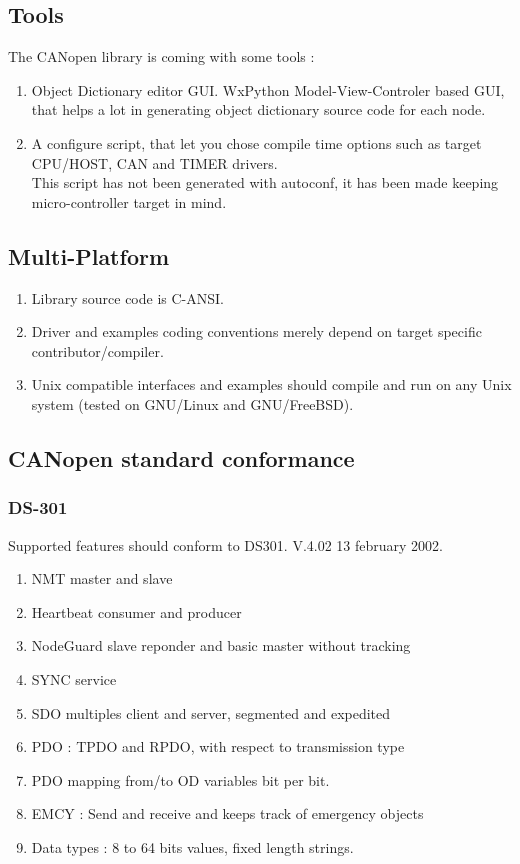 \documentclass[12pt,english,a4paper]{book}
\newcommand{\canopen}{CANopen }
\begin{document}
\subsection{Tools }

The \canopen library is coming with some tools :

\begin{enumerate}
\item Object Dictionary editor GUI. WxPython Model-View-Controler based
GUI, that helps a lot in generating object dictionary source code for
each node. 
\item A configure script, that let you chose compile time options such as
target CPU/HOST, CAN and TIMER drivers.\\
 This script has not been generated with autoconf, it has been made
keeping micro-controller target in mind. 
\end{enumerate}

\subsection{Multi-Platform}

\begin{enumerate}
\item Library source code is C-ANSI. 
\item Driver and examples coding conventions merely depend on target specific
contributor/compiler. 
\item Unix compatible interfaces and examples should compile and run on
any Unix system (tested on GNU/Linux and GNU/FreeBSD). 
\end{enumerate}

\subsection{\canopen standard conformance}

\subsubsection{DS-301}

Supported features should conform to DS301. V.4.02 13 february 2002. 

\begin{enumerate}
\item NMT master and slave
\item Heartbeat consumer and producer
\item NodeGuard slave reponder and basic master without tracking
\item SYNC service
\item SDO multiples client and server, segmented and expedited
\item PDO : TPDO and RPDO, with respect to transmission type
\item PDO mapping from/to OD variables bit per bit. 
\item EMCY : Send and receive and keeps track of emergency objects
\item Data types : 8 to 64 bits values, fixed length strings.
\end{enumerate}
\end{document}
